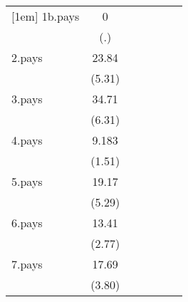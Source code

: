 {\begin{tabular}{l*{6}{c}}
[1em]
1b.pays             &           0         &                     &                     &                     &                     &                     \\
                    &         (.)         &                     &                     &                     &                     &                     \\
[1em]
2.pays              &       23.84\sym{***}&                     &                     &                     &                     &                     \\
                    &      (5.31)         &                     &                     &                     &                     &                     \\
[1em]
3.pays              &       34.71\sym{***}&                     &                     &                     &                     &                     \\
                    &      (6.31)         &                     &                     &                     &                     &                     \\
[1em]
4.pays              &       9.183         &                     &                     &                     &                     &                     \\
                    &      (1.51)         &                     &                     &                     &                     &                     \\
[1em]
5.pays              &       19.17\sym{***}&                     &                     &                     &                     &                     \\
                    &      (5.29)         &                     &                     &                     &                     &                     \\
[1em]
6.pays              &       13.41\sym{**} &                     &                     &                     &                     &                     \\
                    &      (2.77)         &                     &                     &                     &                     &                     \\
[1em]
7.pays              &       17.69\sym{***}&                     &                     &                     &                     &                     \\
                    &      (3.80)         &                     &                     &                     &                     &                     \\

\end{tabular}}
